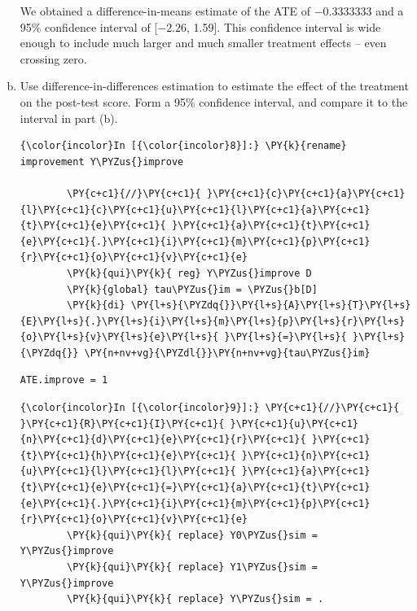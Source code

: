 \documentclass[11pt,notitlepage]{article}\usepackage[]{graphicx}\usepackage[]{color}
\makeatletter
\newenvironment{kframe}{%
 \def\at@end@of@kframe{}%
 \ifinner\ifhmode%
  \def\at@end@of@kframe{\end{minipage}}%
  \begin{minipage}{\columnwidth}%
 \fi\fi%
 \def\FrameCommand##1{\hskip\@totalleftmargin \hskip-\fboxsep
 \colorbox{shadecolor}{##1}\hskip-\fboxsep
     \hskip-\linewidth \hskip-\@totalleftmargin \hskip\columnwidth}%
 \MakeFramed {\advance\hsize-\width
   \@totalleftmargin\z@ \linewidth\hsize
   \@setminipage}}%
 {\par\unskip\endMakeFramed%
 \at@end@of@kframe}
\newenvironment{knitrout}{}{} %
\makeatother
\begin{document}
\begin{enumerate}[a)]
We obtained a difference-in-means estimate of the ATE of \ensuremath{-0.3333333} and a 95\% confidence interval of [\ensuremath{-2.26}, 1.59]. This confidence interval is wide enough to include much larger and much smaller treatment effects -- even crossing zero.

\item Use difference-in-differences estimation to estimate the effect of the treatment on the post-test score. Form a 95\% confidence interval, and compare it to the interval in part (b).

\begin{knitrout}
\color{fgcolor}\begin{kframe}
    \begin{Verbatim}[commandchars=\\\{\}]
{\color{incolor}In [{\color{incolor}8}]:} \PY{k}{rename} improvement Y\PYZus{}improve 
        
        \PY{c+c1}{//}\PY{c+c1}{ }\PY{c+c1}{c}\PY{c+c1}{a}\PY{c+c1}{l}\PY{c+c1}{c}\PY{c+c1}{u}\PY{c+c1}{l}\PY{c+c1}{a}\PY{c+c1}{t}\PY{c+c1}{e}\PY{c+c1}{ }\PY{c+c1}{a}\PY{c+c1}{t}\PY{c+c1}{e}\PY{c+c1}{.}\PY{c+c1}{i}\PY{c+c1}{m}\PY{c+c1}{p}\PY{c+c1}{r}\PY{c+c1}{o}\PY{c+c1}{v}\PY{c+c1}{e}
        \PY{k}{qui}\PY{k}{ reg} Y\PYZus{}improve D
        \PY{k}{global} tau\PYZus{}im = \PYZus{}b[D]
        \PY{k}{di} \PY{l+s}{\PYZdq{}}\PY{l+s}{A}\PY{l+s}{T}\PY{l+s}{E}\PY{l+s}{.}\PY{l+s}{i}\PY{l+s}{m}\PY{l+s}{p}\PY{l+s}{r}\PY{l+s}{o}\PY{l+s}{v}\PY{l+s}{e}\PY{l+s}{ }\PY{l+s}{=}\PY{l+s}{ }\PY{l+s}{\PYZdq{}} \PY{n+nv+vg}{\PYZdl{}}\PY{n+nv+vg}{tau\PYZus{}im}
\end{Verbatim}

    \begin{Verbatim}[commandchars=\\\{\}]
ATE.improve = 1

    \end{Verbatim}

    \begin{Verbatim}[commandchars=\\\{\}]
{\color{incolor}In [{\color{incolor}9}]:} \PY{c+c1}{//}\PY{c+c1}{ }\PY{c+c1}{R}\PY{c+c1}{I}\PY{c+c1}{ }\PY{c+c1}{u}\PY{c+c1}{n}\PY{c+c1}{d}\PY{c+c1}{e}\PY{c+c1}{r}\PY{c+c1}{ }\PY{c+c1}{t}\PY{c+c1}{h}\PY{c+c1}{e}\PY{c+c1}{ }\PY{c+c1}{n}\PY{c+c1}{u}\PY{c+c1}{l}\PY{c+c1}{l}\PY{c+c1}{ }\PY{c+c1}{a}\PY{c+c1}{t}\PY{c+c1}{e}\PY{c+c1}{=}\PY{c+c1}{a}\PY{c+c1}{t}\PY{c+c1}{e}\PY{c+c1}{.}\PY{c+c1}{i}\PY{c+c1}{m}\PY{c+c1}{p}\PY{c+c1}{r}\PY{c+c1}{o}\PY{c+c1}{v}\PY{c+c1}{e}
        \PY{k}{qui}\PY{k}{ replace} Y0\PYZus{}sim = Y\PYZus{}improve
        \PY{k}{qui}\PY{k}{ replace} Y1\PYZus{}sim = Y\PYZus{}improve
        \PY{k}{qui}\PY{k}{ replace} Y\PYZus{}sim = .
        

\end{Verbatim}
\end{kframe}
\end{knitrout}
\end{enumerate}
\end{document}
